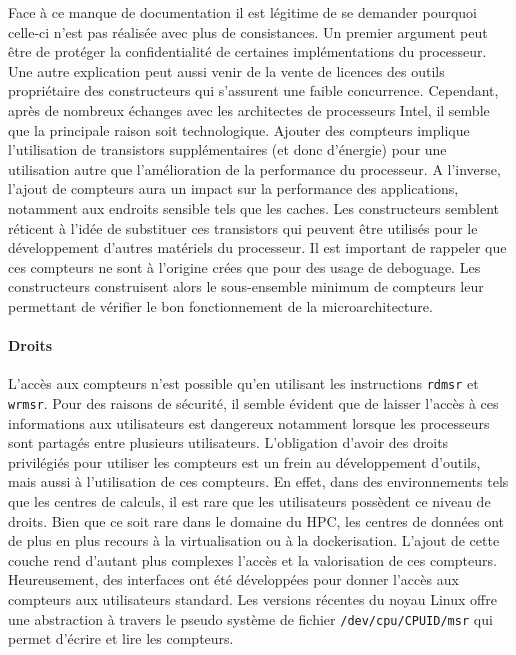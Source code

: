             Face à ce manque de documentation il est légitime de se demander pourquoi celle-ci n'est pas réalisée avec plus de consistances. Un premier argument  peut être de protéger la confidentialité de certaines implémentations du processeur. Une autre explication peut aussi venir de la vente de licences des outils propriétaire des constructeurs qui s'assurent une faible concurrence. Cependant, après de nombreux échanges avec les architectes de processeurs Intel, il semble que la principale raison soit technologique. Ajouter des compteurs implique l'utilisation de transistors supplémentaires (et donc d'énergie) pour une utilisation autre que l'amélioration de la performance du processeur. A l'inverse, l'ajout de compteurs aura un impact sur la performance des applications, notamment aux endroits sensible tels que les caches. Les constructeurs semblent réticent à l'idée de substituer ces transistors qui peuvent être utilisés pour le développement d'autres matériels du processeur. Il est important de rappeler que ces compteurs ne sont à l'origine crées que pour des usage de deboguage. Les constructeurs construisent alors le sous-ensemble minimum de compteurs leur permettant de vérifier le bon fonctionnement de la microarchitecture.
            


            
            
        \paragraph{Droits}
            L'accès aux compteurs n'est possible qu'en utilisant les instructions \verb=rdmsr= et \verb=wrmsr=. Pour des raisons de sécurité, il semble évident que de laisser l'accès à ces informations aux utilisateurs est dangereux notamment lorsque les processeurs sont partagés entre plusieurs utilisateurs. L'obligation d'avoir des droits privilégiés pour utiliser les compteurs est un frein au développement d'outils, mais aussi à l'utilisation de ces compteurs. En effet, dans des environnements tels que les centres de calculs, il est rare que les utilisateurs possèdent ce niveau de droits. Bien que ce soit rare dans le domaine du HPC, les centres de données ont de plus en plus recours à la virtualisation ou à la dockerisation. L'ajout de cette couche rend d'autant plus complexes l'accès et la valorisation de ces compteurs. 
            Heureusement, des interfaces ont été développées pour donner l'accès aux compteurs aux utilisateurs standard. Les versions récentes du noyau Linux offre une abstraction à travers le pseudo système de fichier \verb=/dev/cpu/CPUID/msr= qui permet d'écrire et lire les compteurs. 
     
